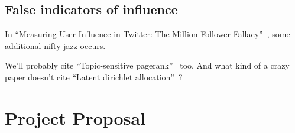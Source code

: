 \documentclass[11pt]{article}
\newcommand{\titlecite}[2]{``#1''~\cite{#2}}
\begin{document}
\subsection{False indicators of influence}
In \titlecite{Measuring User Influence in Twitter: The Million Follower Fallacy}{weng2010twitterrank}, 
some additional nifty jazz occurs.



We'll probably cite \titlecite{Topic-sensitive pagerank}{haveliwala2002topic} too. And what kind of a crazy
paper doesn't cite \titlecite{Latent dirichlet allocation}{blei2003latent}?

\section{Project Proposal}
{} 
\end{document}
